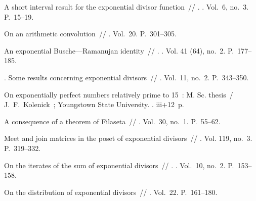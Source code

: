 \documentclass[12pt,a4paper]{article}
\begin{document}
\begin{thebibliography}{10}
 A short interval result for the exponential divisor
  function~// . \BibDash
{}. \BibDash
\newblock Vol.~6, no.~3. \BibDash
\newblock P.~15--19.

 On an arithmetic convolution~//
  \href{http://dx.doi.org/10.4153/CMB-1977-046-9}{}
  \BibDash
{}. \BibDash
\newblock Vol.~20. \BibDash
\newblock P.~301--305.

 An exponential Busche---Ramanujan identity~//
  . \BibDash
{}. \BibDash
\newblock Vol. 41 (64), no.~2. \BibDash
\newblock P.~177--185.

. Some results concerning exponential divisors~//
  \href{http://dx.doi.org/10.1155/S0161171288000407}{} \BibDash
{}. \BibDash
\newblock Vol.~11, no.~2. \BibDash
\newblock P.~343--350.

 On exponentially perfect numbers relatively prime to
  15~: M. Sc. thesis~/ J.~F.~Kolenick~; Youngstown State University. \BibDash
{}. \BibDash
\newblock iii+12~p.

 A consequence of a
  theorem of Filaseta~//  \BibDash
{}. \BibDash
\newblock Vol.~30, no.~1. \BibDash
\newblock P.~55--62.

 Meet and join matrices in the poset of
  exponential divisors~//
  \href{http://dx.doi.org/10.1007/s12044-009-0031-2}{} \BibDash
{}. \BibDash
\newblock Vol. 119, no.~3. \BibDash
\newblock P.~319--332.

 On the iterates of the sum of exponential
  divisors~// . \BibDash
{}. \BibDash
\newblock Vol.~10, no.~2. \BibDash
\newblock P.~153--158.

 On the distribution of exponential
  divisors~// 
  \BibDash
{}. \BibDash
\newblock Vol.~22. \BibDash
\newblock P.~161--180.


\end{thebibliography}
\end{document}
